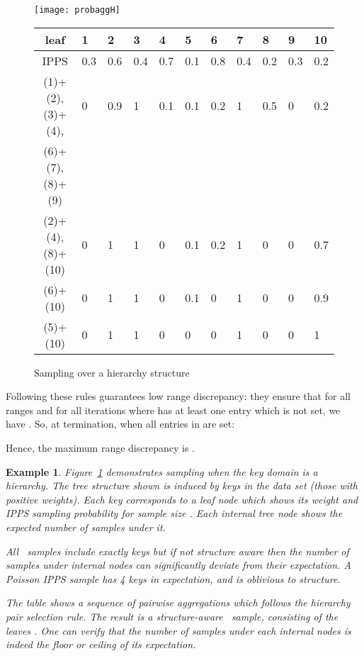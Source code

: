 \documentclass[11pt]{article}
\newtheorem{example}{Example}
\begin{document}
\begin{figure}[t]
\centering
\texttt{[image: probaggH]}
\vspace{0.2in}

\centering
\begin{tabular}{c|llllllllll}
leaf & 1 & 2 & 3 & 4 & 5 & 6 & 7 & 8 & 9 & 10 \\
\hline
IPPS & 0.3 & 0.6 & 0.4 & 0.7 & 0.1 & 0.8 & 0.4 & 0.2 & 0.3 & 0.2 \\
\hline
(1)+(2),(3)+(4), & 0 & 0.9 & 1 & 0.1 & 0.1 & 0.2 & 1 & 0.5 & 0 & 0.2 \\
(6)+(7),(8)+(9) & \multicolumn{10}{c}{} \\
(2)+(4), (8)+(10) &  0 & 1 & 1 & 0 & 0.1 & 0.2 & 1 & 0 & 0 & 0.7 \\
(6)+(10) & 0 & 1 & 1 & 0 & 0.1 & 0 & 1 & 0 & 0 & 0.9 \\ 
(5)+(10) & 0 & 1 & 1 & 0 & 0 & 0 & 1 & 0 & 0 & 1 
\end{tabular}
\caption{Sampling over a hierarchy structure}
\label{probaggH:fig}
\end{figure}

Following these rules guarantees low range discrepancy:
they ensure that
for all ranges  and for all iterations  where  has at 
least one entry which is not set, we have 
.
So,
 at termination, 
when all entries in  are set:
 
Hence, the maximum range discrepancy is . 

\begin{example}
Figure~\ref{probaggH:fig} demonstrates sampling when the key domain is a hierarchy.  The tree structure shown is induced by 
keys in the data set (those with positive weights).  Each key corresponds to
a leaf node which shows its weight and IPPS sampling probability for sample size . Each internal tree node shows the expected number of samples under it.

All \varopt\ samples include exactly  keys but if not
structure aware then the number of samples under internal nodes 
can significantly deviate from their expectation.
A Poisson IPPS sample has 4 keys in expectation, and is 
oblivious to structure.

The table shows a sequence of pairwise aggregations which follows
the hierarchy pair selection rule. The result is a structure-aware
\varopt\ sample, consisting of the leaves . 
One can verify that the number of samples under each internal nodes is 
indeed the floor or
ceiling of its expectation.
\end{example}
\end{document}
